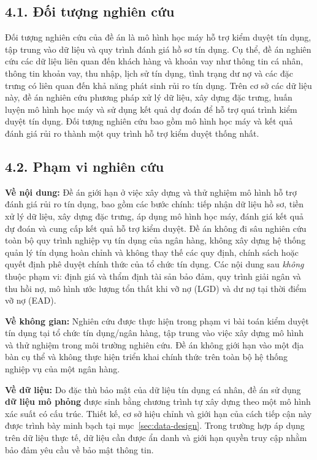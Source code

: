 \subsection*{4.1. Đối tượng nghiên cứu}

Đối tượng nghiên cứu của đề án là mô hình học máy hỗ trợ kiểm duyệt tín dụng, tập
trung vào dữ liệu và quy trình đánh giá hồ sơ tín dụng. Cụ thể,
đề án nghiên cứu các dữ liệu liên quan đến khách hàng và khoản vay như thông tin
cá nhân, thông tin khoản vay, thu nhập, lịch sử tín dụng, tình trạng dư nợ và các
đặc trưng có liên quan đến khả năng phát sinh rủi ro tín dụng. Trên cơ sở các dữ
liệu này, đề án nghiên cứu phương pháp xử lý dữ liệu, xây dựng đặc trưng, huấn
luyện mô hình học máy và sử dụng kết quả dự đoán để hỗ trợ quá trình kiểm duyệt
tín dụng. Đối tượng nghiên cứu bao gồm mô hình học máy và kết quả đánh giá rủi ro
thành một quy trình hỗ trợ kiểm duyệt thống nhất.

\subsection*{4.2. Phạm vi nghiên cứu}

\textbf{Về nội dung:} Đề án giới hạn ở việc xây dựng và thử nghiệm mô hình hỗ trợ
đánh giá rủi ro tín dụng, bao gồm các bước chính: tiếp nhận dữ liệu hồ sơ,
tiền xử lý dữ liệu, xây dựng đặc trưng, áp dụng mô hình học máy, đánh giá kết quả
dự đoán và cung cấp kết quả hỗ trợ kiểm duyệt. Đề án không đi sâu nghiên cứu toàn
bộ quy trình nghiệp vụ tín dụng của ngân hàng, không xây dựng hệ thống quản lý
tín dụng hoàn chỉnh và không thay thế các quy định, chính sách hoặc quyết định
phê duyệt chính thức của tổ chức tín dụng. Các nội dung sau \textit{không} thuộc
phạm vi: định giá và thẩm định tài sản bảo đảm, quy trình giải ngân và thu hồi
nợ, mô hình ước lượng tổn thất khi vỡ nợ (LGD) và dư nợ tại thời điểm vỡ nợ
(EAD).

\textbf{Về không gian:} Nghiên cứu được thực hiện trong phạm vi bài toán kiểm
duyệt tín dụng tại tổ chức tín dụng/ngân hàng, tập trung vào việc xây dựng mô
hình và thử nghiệm trong môi trường nghiên cứu. Đề án không giới hạn vào
một địa bàn cụ thể và không thực hiện triển khai chính thức trên toàn bộ hệ thống
nghiệp vụ của một ngân hàng.

\textbf{Về dữ liệu:} Do đặc thù bảo mật của dữ liệu tín dụng cá nhân, đề án sử
dụng \textbf{dữ liệu mô phỏng} được sinh bằng chương trình tự xây dựng theo một
mô hình xác suất có cấu trúc. Thiết kế, cơ sở hiệu chỉnh và giới hạn của cách
tiếp cận này được trình bày minh bạch tại mục~\ref{sec:data-design}. Trong trường
hợp áp dụng trên dữ liệu thực tế, dữ liệu cần được ẩn danh và giới hạn quyền truy
cập nhằm bảo đảm yêu cầu về bảo mật thông tin.

